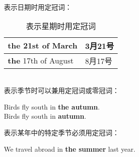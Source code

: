 \documentclass[UTF8]{ctexart}
\begin{document}
    表示日期时用定冠词：
    \begin{table}[h!]
        \begin{center}
            \ttfamily
            \begin{tabular}{p{180pt}|p{100pt}}
                \hline
                \textbf{the} 21st of March&3月21号\\ \hline
                \textbf{the} 17th of August&8月17号\\ \hline
            \end{tabular}
            \rmfamily
            \caption{表示星期时用定冠词}
        \end{center}
    \end{table}\\
    表示季节时可以兼用定冠词或零冠词：
    \begin{center}
        \large\ttfamily
        Birds fly south in \textbf{the autumn}.\\[6mm]
        Birds fly south in \textbf{autumn}.\\[6mm]
    \end{center}
    表示某年中的特定季节必须用定冠词：
    \begin{center}
        \large\ttfamily
        We travel abroad in \textbf{the summer} last year.
    \end{center}
\end{document}

